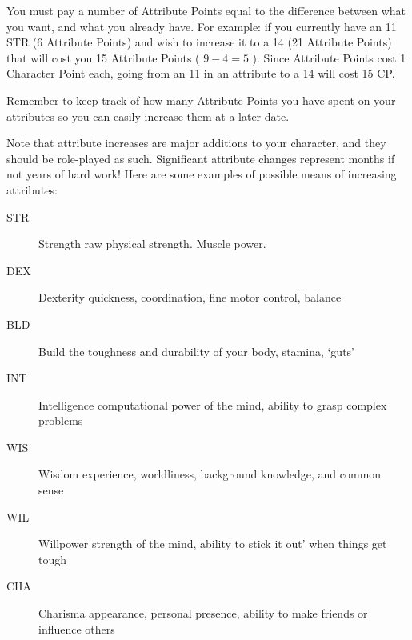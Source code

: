 \documentclass[twoside]{book}
\begin{document}
    {  
    You must pay a number of Attribute Points equal to
              the difference between what you want, and what you already
              have. For example: if you currently have an 11 STR (6
              Attribute Points) and wish to increase it to a 14 (21
              Attribute Points) that will cost you 15 Attribute Points (
              \begin{math} 9  -  4  =
               5 \end{math} ). Since Attribute Points cost
              1 Character Point each, going from an 11 in an attribute to
              a 14 will cost 15 CP.
            
    }
  
    {  
    Remember to keep track of how many Attribute Points
               you have spent on your attributes so you can easily
               increase them at a later date. 
    }
  
    {  
    Note that attribute increases are major additions to
               your character, and they should be role-played as such.
               Significant attribute changes represent months if not
               years of hard work! Here are some examples of possible
               means of increasing attributes: 
    }
  
\begin{description}
    
  \item[ STR ] 
    {  
     Strength raw physical strength. Muscle power.
                   
    }
  
  \item[ DEX ] 
    {  
    Dexterity quickness, coordination, fine motor
                   control, balance 
    }
  
  \item[ BLD ] 
    {  
    Build the toughness and durability of your body,
                   stamina, `guts' 
    }
  
  \item[ INT ] 
    {  
    Intelligence computational power of the mind,
                   ability to grasp complex problems 
    }
  
  \item[ WIS ] 
    {  
    Wisdom experience, worldliness, background
                   knowledge, and common sense 
    }
  
  \item[ WIL ] 
    {  
    Willpower strength of the mind, ability to
                   stick it out' when things get tough
                   
    }
  
  \item[ CHA ] 
    {  
    Charisma appearance, personal presence, ability
                   to make friends or influence others 
    }
  
\end{description}
  
\end{document}
